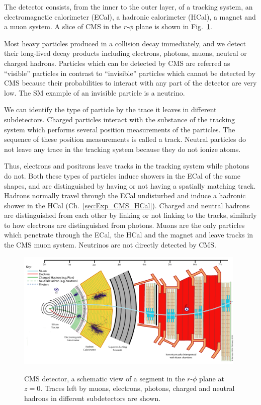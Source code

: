 The detector consists, from the inner to the outer layer,  of a tracking system, an electromagnetic calorimeter (ECal), a hadronic calorimeter (HCal), a magnet and a muon system. A slice of CMS in the $r$-$\phi$ plane is shown in Fig.~\ref{fig:CMS_slice}.

Most heavy particles produced in a collision decay immediately, and we detect their long-lived decay products including electrons, photons, muons, neutral or charged hadrons. Particles which can be detected by CMS are referred as ``visible'' particles in contrast to ``invisible'' particles which cannot be detected by CMS because their probabilities to interact with any part of the detector are very low. The SM example of an invisible particle is a neutrino.

We can identify the type of particle by the trace it leaves in different subdetectors. Charged particles interact with the substance of the tracking system which performs several position measurements of the particles. The sequence of these position measurements is called a track. Neutral particles do not leave any trace in the tracking system because they do not ionize atoms. 

Thus, electrons and positrons leave tracks in the tracking system while photons do not. Both these types of particles induce showers in the ECal of the same shapes, and are distinguished by having or not having a spatially matching track. Hadrons normally travel through the ECal undisturbed and induce a hadronic shower in the HCal (Ch.~\ref{sec:Exp_CMS_HCal}). Charged and neutral hadrons are distinguished from each other by linking or not linking to the tracks, similarly to how electrons are distinguished from photons. Muons are the only particles which penetrate through the ECal, the HCal and the magnet and leave tracks in the CMS muon system. Neutrinos are not directly detected by CMS.   

\clearpage

\begin{figure}[htb]
  \begin{center}
    {\includegraphics[width=0.98\textwidth]{../figs/Exp/CMS_Slice.png}}
    \caption{CMS detector, a schematic view of a segment in the $r$-$\phi$ plane at $z=0$. Traces left by muons, electrons, photons, charged and neutral hadrons in different subdetectors are shown.}
    \label{fig:CMS_slice}
  \end{center}
\end{figure}

